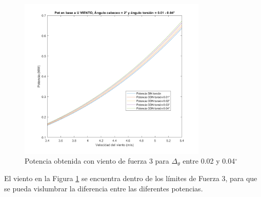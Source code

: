 \begin{figure}[H]
    \centering
    \includegraphics[width=0.8\textwidth]{images/3beau torsion 001 to 004.png}
    \caption{Potencia obtenida con viento de fuerza 3 para $\Delta_\theta$ entre 0.02 y 0.04$^{\circ}$ }
     \label{fig:0-3beaufort_torsion}
\end{figure}

El viento en la Figura \ref{fig:0-3beaufort_torsion} se encuentra dentro de los límites de Fuerza 3, para que se pueda vislumbrar la diferencia entre las diferentes potencias.









